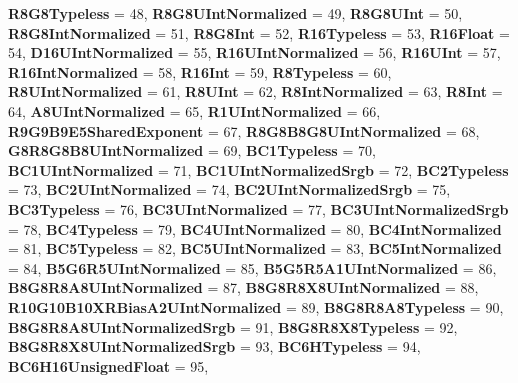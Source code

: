 \begin{DoxyCompactItemize}
{\bfseries R8\+G8\+Typeless} = 48, 
{\bfseries R8\+G8\+U\+Int\+Normalized} = 49, 
{\bfseries R8\+G8\+U\+Int} = 50, 
{\bfseries R8\+G8\+Int\+Normalized} = 51, 
\newline
{\bfseries R8\+G8\+Int} = 52, 
{\bfseries R16\+Typeless} = 53, 
{\bfseries R16\+Float} = 54, 
{\bfseries D16\+U\+Int\+Normalized} = 55, 
\newline
{\bfseries R16\+U\+Int\+Normalized} = 56, 
{\bfseries R16\+U\+Int} = 57, 
{\bfseries R16\+Int\+Normalized} = 58, 
{\bfseries R16\+Int} = 59, 
\newline
{\bfseries R8\+Typeless} = 60, 
{\bfseries R8\+U\+Int\+Normalized} = 61, 
{\bfseries R8\+U\+Int} = 62, 
{\bfseries R8\+Int\+Normalized} = 63, 
\newline
{\bfseries R8\+Int} = 64, 
{\bfseries A8\+U\+Int\+Normalized} = 65, 
{\bfseries R1\+U\+Int\+Normalized} = 66, 
{\bfseries R9\+G9\+B9\+E5\+Shared\+Exponent} = 67, 
\newline
{\bfseries R8\+G8\+B8\+G8\+U\+Int\+Normalized} = 68, 
{\bfseries G8\+R8\+G8\+B8\+U\+Int\+Normalized} = 69, 
{\bfseries B\+C1\+Typeless} = 70, 
{\bfseries B\+C1\+U\+Int\+Normalized} = 71, 
\newline
{\bfseries B\+C1\+U\+Int\+Normalized\+Srgb} = 72, 
{\bfseries B\+C2\+Typeless} = 73, 
{\bfseries B\+C2\+U\+Int\+Normalized} = 74, 
{\bfseries B\+C2\+U\+Int\+Normalized\+Srgb} = 75, 
\newline
{\bfseries B\+C3\+Typeless} = 76, 
{\bfseries B\+C3\+U\+Int\+Normalized} = 77, 
{\bfseries B\+C3\+U\+Int\+Normalized\+Srgb} = 78, 
{\bfseries B\+C4\+Typeless} = 79, 
\newline
{\bfseries B\+C4\+U\+Int\+Normalized} = 80, 
{\bfseries B\+C4\+Int\+Normalized} = 81, 
{\bfseries B\+C5\+Typeless} = 82, 
{\bfseries B\+C5\+U\+Int\+Normalized} = 83, 
\newline
{\bfseries B\+C5\+Int\+Normalized} = 84, 
{\bfseries B5\+G6\+R5\+U\+Int\+Normalized} = 85, 
{\bfseries B5\+G5\+R5\+A1\+U\+Int\+Normalized} = 86, 
{\bfseries B8\+G8\+R8\+A8\+U\+Int\+Normalized} = 87, 
\newline
{\bfseries B8\+G8\+R8\+X8\+U\+Int\+Normalized} = 88, 
{\bfseries R10\+G10\+B10\+X\+R\+Bias\+A2\+U\+Int\+Normalized} = 89, 
{\bfseries B8\+G8\+R8\+A8\+Typeless} = 90, 
{\bfseries B8\+G8\+R8\+A8\+U\+Int\+Normalized\+Srgb} = 91, 
\newline
{\bfseries B8\+G8\+R8\+X8\+Typeless} = 92, 
{\bfseries B8\+G8\+R8\+X8\+U\+Int\+Normalized\+Srgb} = 93, 
{\bfseries B\+C6\+H\+Typeless} = 94, 
{\bfseries B\+C6\+H16\+Unsigned\+Float} = 95, 

\end{DoxyCompactItemize}
